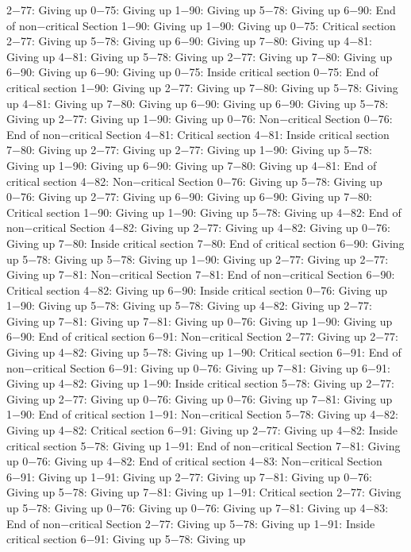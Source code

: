 2−77: Giving up
0−75: Giving up
1−90: Giving up
5−78: Giving up
6−90: End of non−critical Section
1−90: Giving up
1−90: Giving up
0−75: Critical section
2−77: Giving up
5−78: Giving up
6−90: Giving up
7−80: Giving up
4−81: Giving up
4−81: Giving up
5−78: Giving up
2−77: Giving up
7−80: Giving up
6−90: Giving up
6−90: Giving up
0−75: Inside critical section
0−75: End of critical section
1−90: Giving up
2−77: Giving up
7−80: Giving up
5−78: Giving up
4−81: Giving up
7−80: Giving up
6−90: Giving up
6−90: Giving up
5−78: Giving up
2−77: Giving up
1−90: Giving up
0−76: Non−critical Section
0−76: End of non−critical Section
4−81: Critical section
4−81: Inside critical section
7−80: Giving up
2−77: Giving up
2−77: Giving up
1−90: Giving up
5−78: Giving up
1−90: Giving up
6−90: Giving up
7−80: Giving up
4−81: End of critical section
4−82: Non−critical Section
0−76: Giving up
5−78: Giving up
0−76: Giving up
2−77: Giving up
6−90: Giving up
6−90: Giving up
7−80: Critical section
1−90: Giving up
1−90: Giving up
5−78: Giving up
4−82: End of non−critical Section
4−82: Giving up
2−77: Giving up
4−82: Giving up
0−76: Giving up
7−80: Inside critical section
7−80: End of critical section
6−90: Giving up
5−78: Giving up
5−78: Giving up
1−90: Giving up
2−77: Giving up
2−77: Giving up
7−81: Non−critical Section
7−81: End of non−critical Section
6−90: Critical section
4−82: Giving up
6−90: Inside critical section
0−76: Giving up
1−90: Giving up
5−78: Giving up
5−78: Giving up
4−82: Giving up
2−77: Giving up
7−81: Giving up
7−81: Giving up
0−76: Giving up
1−90: Giving up
6−90: End of critical section
6−91: Non−critical Section
2−77: Giving up
2−77: Giving up
4−82: Giving up
5−78: Giving up
1−90: Critical section
6−91: End of non−critical Section
6−91: Giving up
0−76: Giving up
7−81: Giving up
6−91: Giving up
4−82: Giving up
1−90: Inside critical section
5−78: Giving up
2−77: Giving up
2−77: Giving up
0−76: Giving up
0−76: Giving up
7−81: Giving up
1−90: End of critical section
1−91: Non−critical Section
5−78: Giving up
4−82: Giving up
4−82: Critical section
6−91: Giving up
2−77: Giving up
4−82: Inside critical section
5−78: Giving up
1−91: End of non−critical Section
7−81: Giving up
0−76: Giving up
4−82: End of critical section
4−83: Non−critical Section
6−91: Giving up
1−91: Giving up
2−77: Giving up
7−81: Giving up
0−76: Giving up
5−78: Giving up
7−81: Giving up
1−91: Critical section
2−77: Giving up
5−78: Giving up
0−76: Giving up
0−76: Giving up
7−81: Giving up
4−83: End of non−critical Section
2−77: Giving up
5−78: Giving up
1−91: Inside critical section
6−91: Giving up
5−78: Giving up
